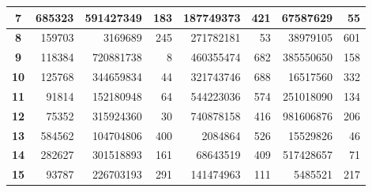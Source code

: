 \documentclass[12pt]{article}
\begin{document}
\begin{table}[!htbp]
{\begin{tabular}{crrrrrrr}
\multicolumn{1}{|c|}{\textbf{7}} & \multicolumn{1}{r|}{685323} & \multicolumn{1}{r|}{591427349} & \multicolumn{1}{r|}{183} & \multicolumn{1}{r|}{187749373} & \multicolumn{1}{r|}{421} & \multicolumn{1}{r|}{67587629} & \multicolumn{1}{r|}{55} \\ \hline
\multicolumn{1}{|c|}{\textbf{8}} & \multicolumn{1}{r|}{159703} & \multicolumn{1}{r|}{3169689} & \multicolumn{1}{r|}{245} & \multicolumn{1}{r|}{271782181} & \multicolumn{1}{r|}{53} & \multicolumn{1}{r|}{38979105} & \multicolumn{1}{r|}{601} \\ \hline
\multicolumn{1}{|c|}{\textbf{9}} & \multicolumn{1}{r|}{118384} & \multicolumn{1}{r|}{720881738} & \multicolumn{1}{r|}{8} & \multicolumn{1}{r|}{460355474} & \multicolumn{1}{r|}{682} & \multicolumn{1}{r|}{385550650} & \multicolumn{1}{r|}{158} \\ \hline
\multicolumn{1}{|c|}{\textbf{10}} & \multicolumn{1}{r|}{125768} & \multicolumn{1}{r|}{344659834} & \multicolumn{1}{r|}{44} & \multicolumn{1}{r|}{321743746} & \multicolumn{1}{r|}{688} & \multicolumn{1}{r|}{16517560} & \multicolumn{1}{r|}{332} \\ \hline
\multicolumn{1}{|c|}{\textbf{11}} & \multicolumn{1}{r|}{91814} & \multicolumn{1}{r|}{152180948} & \multicolumn{1}{r|}{64} & \multicolumn{1}{r|}{544223036} & \multicolumn{1}{r|}{574} & \multicolumn{1}{r|}{251018090} & \multicolumn{1}{r|}{134} \\ \hline
\multicolumn{1}{|c|}{\textbf{12}} & \multicolumn{1}{r|}{75352} & \multicolumn{1}{r|}{315924360} & \multicolumn{1}{r|}{30} & \multicolumn{1}{r|}{740878158} & \multicolumn{1}{r|}{416} & \multicolumn{1}{r|}{981606876} & \multicolumn{1}{r|}{206} \\ \hline
\multicolumn{1}{|c|}{\textbf{13}} & \multicolumn{1}{r|}{584562} & \multicolumn{1}{r|}{104704806} & \multicolumn{1}{r|}{400} & \multicolumn{1}{r|}{2084864} & \multicolumn{1}{r|}{526} & \multicolumn{1}{r|}{15529826} & \multicolumn{1}{r|}{46} \\ \hline
\multicolumn{1}{|c|}{\textbf{14}} & \multicolumn{1}{r|}{282627} & \multicolumn{1}{r|}{301518893} & \multicolumn{1}{r|}{161} & \multicolumn{1}{r|}{68643519} & \multicolumn{1}{r|}{409} & \multicolumn{1}{r|}{517428657} & \multicolumn{1}{r|}{71} \\ \hline
\multicolumn{1}{|c|}{\textbf{15}} & \multicolumn{1}{r|}{93787} & \multicolumn{1}{r|}{226703193} & \multicolumn{1}{r|}{291} & \multicolumn{1}{r|}{141474963} & \multicolumn{1}{r|}{111} & \multicolumn{1}{r|}{5485521} & \multicolumn{1}{r|}{217} \\ \hline

\end{tabular}}
\end{table}
\end{document}
